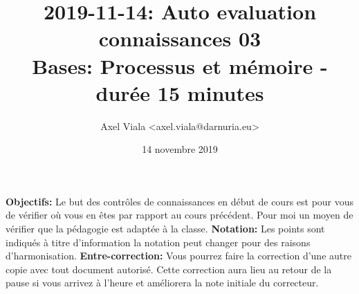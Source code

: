 \documentclass[11pt,a4paper,addpoint,answers]{exam}
\author{Axel Viala <axel.viala@darnuria.eu>}
\title{2019-11-14: Auto evaluation connaissances 03\\Bases: Processus et mémoire - durée 15 minutes}
\date{14 novembre 2019}
\begin{document}
  \maketitle
  \textbf{Objectifs:} Le but des contrôles de connaissances en début de cours est pour vous de vérifier où vous
  en êtes par rapport au cours précédent.
  \newline
  Pour moi un moyen de vérifier que la pédagogie est adaptée à la classe.
  \newline
  \textbf{Notation:} Les points sont indiqués à titre d'information la notation peut changer pour
  des raisons d'harmonisation.
  \newline
  \textbf{Entre-correction:} Vous pourrez faire la correction d'une autre copie avec tout document
  autorisé. Cette correction aura lieu au retour de la pause si vous arrivez à l'heure et
  améliorera la note initiale du correcteur.
\end{document}

